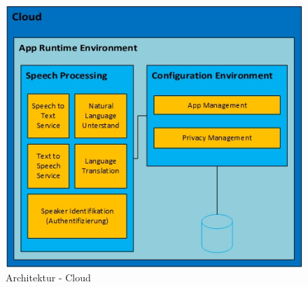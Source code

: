 \setcounter{figure}{11}  
\begin{figure}[h!]
	\centering
	\includegraphics[width=0.9\linewidth]{Picture/Infrastruktur-Cloud.jpg}
	\caption[Architektur - Mobile App]{Architektur - Cloud}
	\label{fig:infrastruktur-cloud}
\end{figure}


